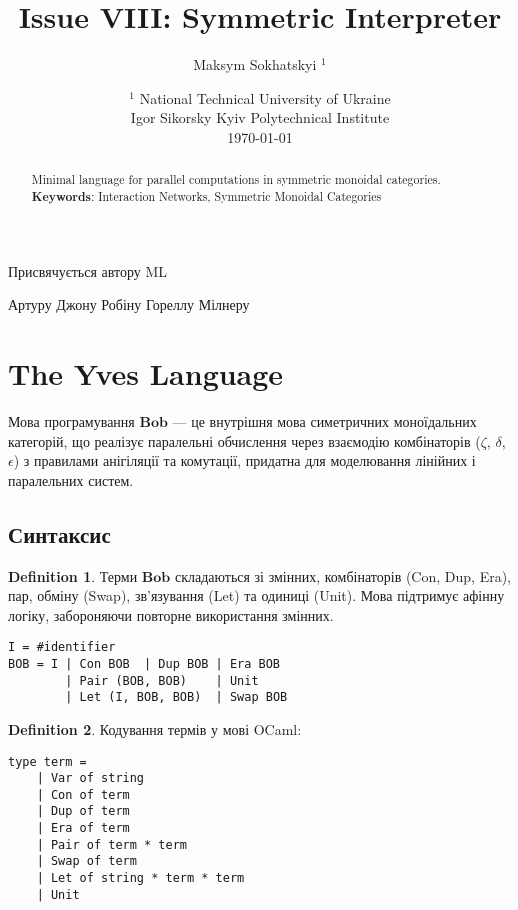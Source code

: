 \documentclass{article}
\theoremstyle{definition}
\newtheorem{definition}{Definition}
\begin{document}
\title{Issue VIII: Symmetric Interpreter}
\author{Maksym Sokhatskyi $^1$}
\date{ $^1$ National Technical University of Ukraine \\
       \small Igor Sikorsky Kyiv Polytechnical Institute \\
       \today }

\maketitle

\begin{abstract}

Minimal language for parallel computations in symmetric monoidal categories. \\
{\bf Keywords}: Interaction Networks, Symmetric Monoidal Categories
\end{abstract}

\ifincludeTOC
  \tableofcontents
\fi

\newpage

\epigraph{Присвячується автору ML}{Артуру Джону Робіну Гореллу Мілнеру}

\section{The Yves Language}

Мова програмування $\mathbf{Bob}$ — це внутрішня мова симетричних моноїдальних категорій,
що реалізує паралельні обчислення через взаємодію комбінаторів ($\zeta$, $\delta$, $\epsilon$) з правилами
анігіляції та комутації, придатна для моделювання лінійних і паралельних систем.

\subsection{Синтаксис}

\begin{definition}
Терми $\mathbf{Bob}$ складаються зі змінних, комбінаторів (Con, Dup, Era), пар, обміну (Swap),
зв’язування (Let) та одиниці (Unit). Мова підтримує афінну логіку, забороняючи повторне використання змінних.
\begin{lstlisting}[mathescape=true]
I = #identifier
BOB = I | Con BOB  | Dup BOB | Era BOB
        | Pair (BOB, BOB)    | Unit
        | Let (I, BOB, BOB)  | Swap BOB
\end{lstlisting}
\end{definition}

\begin{definition}
Кодування термів у мові OCaml:
\begin{lstlisting}[mathescape=true]
type term =
    | Var of string
    | Con of term
    | Dup of term
    | Era of term
    | Pair of term * term
    | Swap of term
    | Let of string * term * term
    | Unit
\end{lstlisting}
\end{definition}
\end{document}
